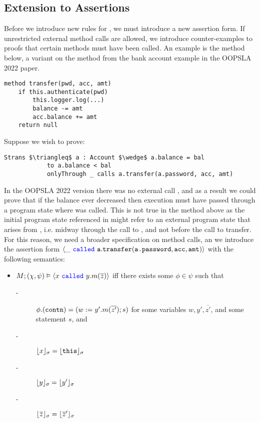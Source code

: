 \documentclass[11pt]{article} %
\theoremstyle{definition}
\begin{document}
\subsection{Extension to \Nec Assertions}
Before we introduce new rules for \Nec, we must introduce a new assertion form.
If unrestricted external method calls are allowed, we introduce counter-examples to proofs that certain methods 
must have been called. An example is the  method below, a variant on the  method 
from the bank account example in the OOPSLA 2022 paper.
\begin{lstlisting}[language = Chainmail, mathescape=true, frame=lines]
method transfer(pwd, acc, amt)
	if this.authenticate(pwd)
		this.logger.log(...)
		balance -= amt
		acc.balance += amt
	return null
\end{lstlisting}
Suppose we wish to prove:
\begin{lstlisting}[language = Chainmail, frame = lines, mathescape = true]
Strans $\triangleq$ a : Account $\wedge$ a.balance = bal
			to a.balance < bal
			onlyThrough _ calls a.transfer(a.password, acc, amt)
\end{lstlisting}
In the OOPSLA 2022 version there was no external call , and as a result we could prove that if the 
balance ever decreased then execution must have passed through a program state where  was called.
This is not true in the  method above as the initial program state referenced in  might
refer to an external program state that arises from , i.e. midway through the call to ,
and not before the call to transfer. For this reason, we need a broader specification on method calls, an we introduce
the assertion form $\langle \_\ {\color{blue}\texttt{called}}\ {\texttt{a}}.{\texttt{transfer}}({\texttt{a.password}}, {\texttt{acc}}, {\texttt{amt}}) \rangle$ with the following semantics:
\begin{itemize}
\item
$M; (\chi, \psi) \vDash \langle x\ {\color{blue}\texttt{called}}\ y.m(\overline{z}) \rangle$ iff there exists some $\phi \in \psi$ such that 
\begin{description}
\item[-]
$\phi.({\texttt{contn}}) = (w := y'.m(\overline{z'}); s)$ for some variables $w, y', \overline{z'}$, and some statement $s$, and
\item[-]
$\lfloor x \rfloor_{\sigma} = \lfloor {\texttt{this}} \rfloor_{\sigma}$
\item[-]
$\lfloor y \rfloor_{\sigma} = \lfloor y' \rfloor_{\sigma}$
\item[-]
$\lfloor \overline{z} \rfloor_{\sigma} = \lfloor \overline{z}' \rfloor_{\sigma}$
\end{description}
\end{itemize}
\end{document}
